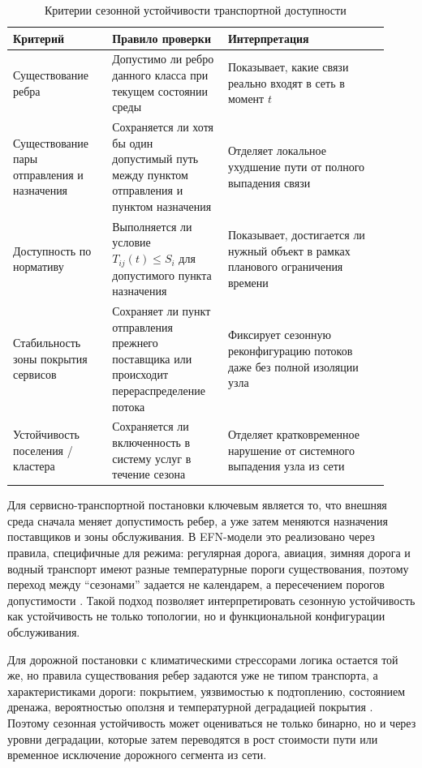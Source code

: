 \begin{table}[ht]
\centering
\caption{Критерии сезонной устойчивости транспортной доступности}
\label{tab:seasonal-resilience-criteria}
\begin{tabular}{p{0.24\linewidth} p{0.29\linewidth} p{0.39\linewidth}}
\hline
\textbf{Критерий} & \textbf{Правило проверки} & \textbf{Интерпретация} \\
\hline
Существование ребра & Допустимо ли ребро данного класса при текущем состоянии среды & Показывает, какие связи реально входят в сеть в момент \(t\) \\
\hline
Существование пары отправления и назначения & Сохраняется ли хотя бы один допустимый путь между пунктом отправления и пунктом назначения & Отделяет локальное ухудшение пути от полного выпадения связи \\
\hline
Доступность по нормативу & Выполняется ли условие \(T_{ij}(t)\leq S_i\) для допустимого пункта назначения & Показывает, достигается ли нужный объект в рамках планового ограничения времени \\
\hline
Стабильность зоны покрытия сервисов & Сохраняет ли пункт отправления прежнего поставщика или происходит перераспределение потока & Фиксирует сезонную реконфигурацию потоков даже без полной изоляции узла \\
\hline
Устойчивость поселения / кластера & Сохраняется ли включенность в систему услуг в течение сезона & Отделяет кратковременное нарушение от системного выпадения узла из сети \\
\hline
\end{tabular}
\end{table}

Для сервисно-транспортной постановки ключевым является то, что внешняя среда
сначала меняет допустимость ребер, а уже затем меняются назначения
поставщиков и зоны обслуживания. В EFN-модели это реализовано через
правила, специфичные для режима: регулярная дорога, авиация, зимняя дорога и водный транспорт
имеют разные температурные пороги существования, поэтому переход между
``сезонами'' задается не календарем, а пересечением порогов допустимости
\cite{dong2025iceRoads,waite2023arcticTransport}. Такой подход позволяет
интерпретировать сезонную устойчивость как устойчивость не только
топологии, но и функциональной конфигурации обслуживания.

Для дорожной постановки с климатическими стрессорами логика остается той же, но правила существования ребер задаются уже не типом транспорта, а характеристиками дороги: покрытием, уязвимостью к подтоплению, состоянием дренажа, вероятностью оползня и температурной деградацией покрытия
\cite{pregnolato2017pluvialFlooding,dottori2016floodHazard,
gariano2016landslides,khan2018asphaltTemperature}. Поэтому сезонная
устойчивость может оцениваться не только бинарно, но и через уровни деградации, которые затем переводятся в рост стоимости пути или временное исключение дорожного сегмента из сети.

